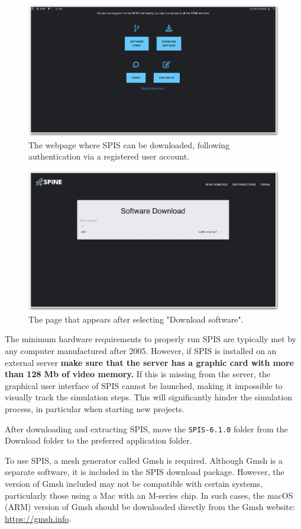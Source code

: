 \documentclass[a4paper, 12pt]{article}
\begin{document}
\begin{figure}[!ht]
    \centering
    \includegraphics[width=1\textwidth]{fig2.jpg}
    \caption{The webpage where SPIS can be downloaded, following authentication via a registered user account.}
    \label{2}
\end{figure}

\begin{figure}[!ht]
    \centering
    \includegraphics[width=1\textwidth]{fig3.jpg}
    \caption{The page that appears after selecting "Download software".}
    \label{3}
\end{figure}

The minimum hardware requirements to properly run SPIS are typically met by any computer manufactured after 2005. However, if SPIS is installed on an external server \textbf{make sure that the server has a graphic card with more than 128 Mb of video memory.} If this is missing from the server, the graphical user interface of SPIS cannot be launched, making it impossible to visually track the simulation steps. This will significantly hinder the simulation process, in particular when starting new projects.\par
After downloading and extracting SPIS, move the \verb|SPIS-6.1.0| folder from the Download folder to the preferred application folder.\par
\newpage
To use SPIS, a mesh generator called Gmsh is required. Although Gmsh is a separate software, it is included in the SPIS download package. However, the version of Gmsh included may not be compatible with certain systems, particularly those using a Mac with an M-series chip. In such cases, the macOS (ARM) version of Gmsh should be downloaded directly from the Gmsh website: \url{https://gmsh.info}.
\end{document}
